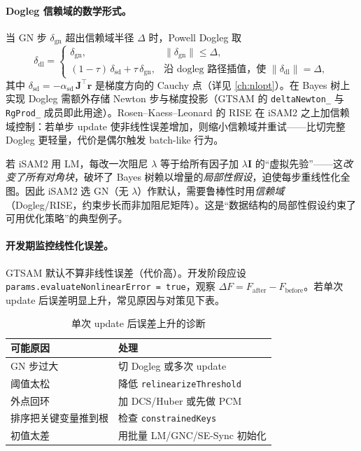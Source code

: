 \paragraph{Dogleg 信赖域的数学形式。}
当 GN 步 $\delta_{\text{gn}}$ 超出信赖域半径 $\Delta$ 时，Powell Dogleg 取
\begin{equation}
  \delta_{\text{dl}}=
  \begin{cases}
    \delta_{\text{gn}}, & \|\delta_{\text{gn}}\|\le\Delta,\\[2pt]
    (1-\tau)\,\delta_{\text{sd}}+\tau\,\delta_{\text{gn}}, & \text{沿 dogleg 路径插值，使 }\|\delta_{\text{dl}}\|=\Delta,
  \end{cases}
  \label{eq:dogleg}
\end{equation}
其中 $\delta_{\text{sd}}=-\alpha_{\text{sd}}\,\mathbf{J}^\top\mathbf{r}$ 是梯度方向的 Cauchy 点（详见 \cref{ch:nlopt}）。在 Bayes 树上实现 Dogleg 需额外存储 Newton 步与梯度投影（GTSAM 的 \texttt{deltaNewton\_} 与 \texttt{RgProd\_} 成员即此用途）。Rosen--Kaess--Leonard 的 RISE\cite{rosen2014rise} 在 iSAM2 之上加信赖域控制：若单步 update 使非线性误差增加，则缩小信赖域并重试——比切完整 Dogleg 更轻量，代价是偶尔触发 batch-like 行为。

\begin{insight}
若 iSAM2 用 LM，每改一次阻尼 $\lambda$ 等于给所有因子加 $\lambda\mathbf{I}$ 的“虚拟先验”——这\emph{改变了所有对角块}，破坏了 Bayes 树赖以增量的\emph{局部性假设}，迫使每步重线性化全图。因此 iSAM2 选 GN（无 $\lambda$）作默认，需要鲁棒性时用\emph{信赖域}（Dogleg/RISE，约束步长而非加阻尼矩阵）。这是“数据结构的局部性假设约束了可用优化策略”的典型例子。
\end{insight}

\paragraph{开发期监控线性化误差。}
GTSAM 默认不算非线性误差（代价高）。开发阶段应设 \texttt{params.\allowbreak evaluateNonlinearError = true}，观察 $\Delta F=F_{\text{after}}-F_{\text{before}}$。若单次 update 后误差明显上升，常见原因与对策见下表。

\begin{table}[H]\centering\small
\caption{单次 update 后误差上升的诊断}
\label{tab:error-up}
\begin{tabular}{ll}
\toprule
可能原因 & 处理 \\
\midrule
GN 步过大 & 切 Dogleg 或多次 update \\
阈值太松 & 降低 \texttt{relinearizeThreshold} \\
外点回环 & 加 DCS/Huber 或先做 PCM \\
排序把关键变量推到根 & 检查 \texttt{constrainedKeys} \\
初值太差 & 用批量 LM/GNC/SE-Sync 初始化 \\
\bottomrule
\end{tabular}
\end{table}

